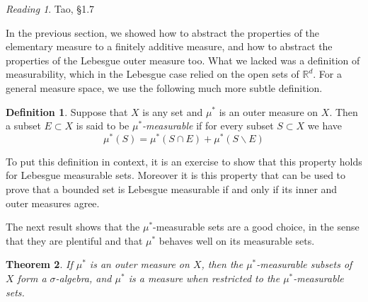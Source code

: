 \documentclass[11pt,oneside]{amsbook}
\renewcommand{\setminus}{\smallsetminus}
\newcommand{\RR}{{\mathbb R}}
\theoremstyle{definition}
\theoremstyle{plain}
\newtheorem{thm}{Theorem}[section]
\theoremstyle{definition}
\newtheorem{defn}[thm]{Definition}
\theoremstyle{remark}
\newtheorem*{reading}{Reading}
\numberwithin{equation}{section}
\numberwithin{figure}{section}
\begin{document}
\begin{reading}
  Tao, \S 1.7
\end{reading}

In the previous section, we showed how to abstract the properties of the elementary measure to a finitely additive measure, and how to abstract the properties of the Lebesgue outer measure too. What we lacked was a definition of measurability, which in the Lebesgue case relied on the open sets of $\RR^d$. For a general measure space, we use the following much more subtle definition.

\begin{defn}
  Suppose that $X$ is any set and $\mu^*$ is an outer measure on $X$. Then a subset $E\subset X$ is said to be \emph{$\mu^*$-measurable} if for every subset $S\subset X$ we have
  \[\mu^*(S)=\mu^*(S\cap E)+\mu^*(S\setminus E)
  \]
\end{defn}

To put this definition in context, it is an exercise to show that this property holds for Lebesgue measurable sets. Moreover it is this property that can be used to prove that a bounded set is Lebesgue measurable if and only if its inner and outer measures agree.

The next result shows that the $\mu^*$-measurable sets are a good choice, in the sense that they are plentiful and that $\mu^*$ behaves well on its measurable sets.

\begin{thm}
  If $\mu^*$ is an outer measure on $X$, then the $\mu^*$-measurable subsets of $X$ form a $\sigma$-algebra, and $\mu^*$ is a measure when restricted to the $\mu^*$-measurable sets.
\end{thm}
\end{document}

